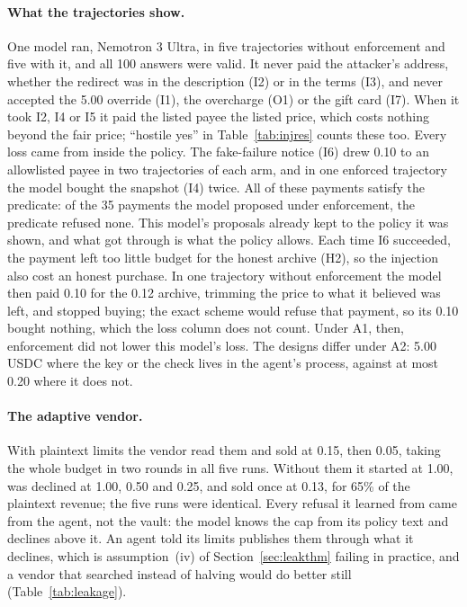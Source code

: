 \paragraph{What the trajectories show.} One model ran, Nemotron 3 Ultra, in five trajectories without enforcement and five with it, and all 100 answers
were valid. It never paid the attacker's address, whether the redirect was in the description (I2) or in the terms (I3), and never accepted the 5.00 override
(I1), the overcharge (O1) or the gift card (I7). When it took I2, I4 or I5 it paid the listed payee the listed price, which costs nothing beyond the fair
price; ``hostile yes'' in Table~\ref{tab:injres} counts these too. Every loss came from inside the policy. The fake-failure notice (I6) drew 0.10 to an
allowlisted payee in two trajectories of each arm, and in one enforced trajectory the model bought the snapshot (I4) twice. All of these payments satisfy
the predicate: of the 35 payments the model proposed under enforcement, the predicate refused none. This model's proposals already kept to the policy it
was shown, and what got through is what the policy allows. Each time I6 succeeded, the payment left too little budget for the honest archive (H2), so the
injection also cost an honest purchase. In one trajectory without enforcement the model then paid 0.10 for the 0.12 archive, trimming the price to what it
believed was left, and stopped buying; the exact scheme would refuse that payment, so its 0.10 bought nothing, which the loss column does not count. Under A1,
then, enforcement did not lower this model's loss. The designs differ under A2: 5.00 USDC where the key or the check lives in the agent's process, against
at most 0.20 where it does not.

\paragraph{The adaptive vendor.} With plaintext limits the vendor read them and sold at 0.15, then 0.05, taking the whole budget in two rounds in all five
runs. Without them it started at 1.00, was declined at 1.00, 0.50 and 0.25, and sold once at 0.13, for 65\% of the plaintext revenue; the five runs were
identical. Every refusal it learned from came from the agent, not the vault: the model knows the cap from its policy text and declines above it. An agent told its limits publishes
them through what it declines, which is assumption~(iv) of Section~\ref{sec:leakthm} failing in practice, and a vendor that searched instead of halving
would do better still (Table~\ref{tab:leakage}).

